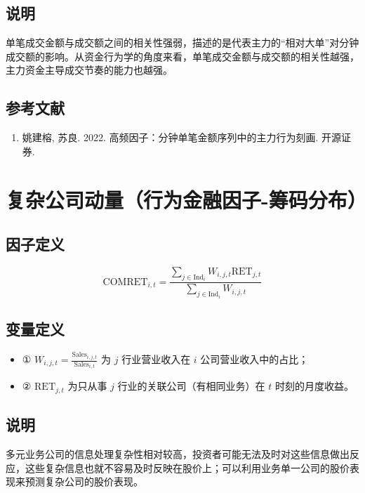 \documentclass{article}
\begin{document}
\subsection{说明}
单笔成交金额与成交额之间的相关性强弱，描述的是代表主力的“相对大单”对分钟成交额的影响。从资金行为学的角度来看，单笔成交金额与成交额的相关性越强，主力资金主导成交节奏的能力也越强。

\subsection{参考文献}
\begin{enumerate}
    \item 姚建榕, 苏良. 2022. 高频因子：分钟单笔金额序列中的主力行为刻画. 开源证券.
\end{enumerate}

\section{复杂公司动量（行为金融因子-筹码分布）}

\subsection{因子定义}
\begin{equation}
    \mathrm{COMRET}_{i,t} = \frac{\sum_{j \in \mathrm{Ind}_i} W_{i,j,t} \mathrm{RET}_{j,t}}{\sum_{j \in \mathrm{Ind}_i} W_{i,j,t}}
\end{equation}

\subsection{变量定义}
\begin{itemize}
    \item ① \( W_{i,j,t} = \frac{\mathrm{Sales}_{i,j,t}}{\mathrm{Sales}_{i,t}} \) 为 \( j \) 行业营业收入在 \( i \) 公司营业收入中的占比；
    \item ② \( \mathrm{RET}_{j,t} \) 为只从事 \( j \) 行业的关联公司（有相同业务）在 \( t \) 时刻的月度收益。
\end{itemize}

\subsection{说明}
多元业务公司的信息处理复杂性相对较高，投资者可能无法及时对这些信息做出反应，这些复杂信息也就不容易及时反映在股价上；可以利用业务单一公司的股价表现来预测复杂公司的股价表现。
\end{document}
